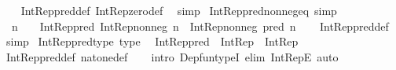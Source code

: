 \begin{isabellebody}
%
\isadelimproof
\ \ %
\endisadelimproof
%
\isatagproof
{}\isamarkupfalse%
\ Int{\isacharunderscore}{\kern0pt}Rep{\isacharunderscore}{\kern0pt}pred{\isacharunderscore}{\kern0pt}def\ Int{\isacharunderscore}{\kern0pt}Rep{\isacharunderscore}{\kern0pt}zero{\isacharunderscore}{\kern0pt}def\ \isamarkupfalse%
\ simp%
\endisatagproof
{\isafoldproof}%
%
\isadelimproof
\isanewline
%
\endisadelimproof
\isanewline
{}\isamarkupfalse%
\ Int{\isacharunderscore}{\kern0pt}Rep{\isacharunderscore}{\kern0pt}pred{\isacharunderscore}{\kern0pt}nonneg{\isacharunderscore}{\kern0pt}eq\ {\isacharbrackleft}{\kern0pt}simp{\isacharbrackright}{\kern0pt}{\isacharcolon}{\kern0pt}\isanewline
\ \ {\isachardoublequoteopen}n\ {\isasymnoteq}\ {}\ {\isasymLongrightarrow}\ Int{\isacharunderscore}{\kern0pt}Rep{\isacharunderscore}{\kern0pt}pred\ {\isacharparenleft}{\kern0pt}Int{\isacharunderscore}{\kern0pt}Rep{\isacharunderscore}{\kern0pt}nonneg\ n{\isacharparenright}{\kern0pt}\ {\isacharequal}{\kern0pt}\ Int{\isacharunderscore}{\kern0pt}Rep{\isacharunderscore}{\kern0pt}nonneg\ {\isacharparenleft}{\kern0pt}pred\ n{\isacharparenright}{\kern0pt}{\isachardoublequoteclose}\isanewline
%
\isadelimproof
\ \ %
\endisadelimproof
%
\isatagproof
{}\isamarkupfalse%
\ Int{\isacharunderscore}{\kern0pt}Rep{\isacharunderscore}{\kern0pt}pred{\isacharunderscore}{\kern0pt}def\ \isamarkupfalse%
\ simp%
\endisatagproof
{\isafoldproof}%
%
\isadelimproof
\isanewline
%
\endisadelimproof
\isanewline
{}\isamarkupfalse%
\ Int{\isacharunderscore}{\kern0pt}Rep{\isacharunderscore}{\kern0pt}pred{\isacharunderscore}{\kern0pt}type\ {\isacharbrackleft}{\kern0pt}type{\isacharbrackright}{\kern0pt}{\isacharcolon}{\kern0pt}\isanewline
\ \ {\isachardoublequoteopen}Int{\isacharunderscore}{\kern0pt}Rep{\isacharunderscore}{\kern0pt}pred\ {\isacharcolon}{\kern0pt}\ Int{\isacharunderscore}{\kern0pt}Rep\ {\isasymRightarrow}\ Int{\isacharunderscore}{\kern0pt}Rep{\isachardoublequoteclose}\isanewline
%
\isadelimproof
\ \ %
\endisadelimproof
%
\isatagproof
{}\isamarkupfalse%
\ Int{\isacharunderscore}{\kern0pt}Rep{\isacharunderscore}{\kern0pt}pred{\isacharunderscore}{\kern0pt}def\ nat{\isacharunderscore}{\kern0pt}one{\isacharunderscore}{\kern0pt}def\isanewline
\ \ \isamarkupfalse%
\ {\isacharparenleft}{\kern0pt}intro\ Dep{\isacharunderscore}{\kern0pt}fun{\isacharunderscore}{\kern0pt}typeI{\isacharcomma}{\kern0pt}\ elim\ Int{\isacharunderscore}{\kern0pt}RepE{\isacharparenright}{\kern0pt}\ auto%
\endisatagproof

\end{isabellebody}
